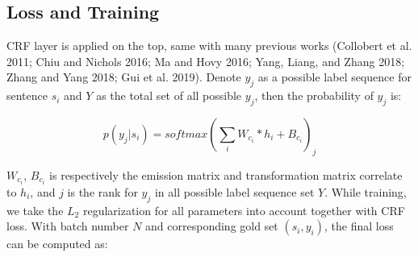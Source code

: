 \documentclass[letterpaper]{article} %
\begin{document}
\begin{table}[t]
\caption{Hyperparameters}\smallskip
\centering
{}
\label{table2}
\end{table}

\subsection{Loss and Training}

CRF layer is applied on the top, same with many previous works (Collobert et al. 2011; Chiu and Nichols 2016; Ma and Hovy 2016; Yang, Liang, and Zhang 2018; Zhang and Yang 2018; Gui et al. 2019). Denote $y_j$ as a possible label sequence for sentence $s_i$ and $Y$ as the total set of all possible $y_j$, then the probability of $y_j$ is:

\begin{equation}
p(y_j | s_i) = softmax(\sum_i{W_{c_i} * h_i} + B_{c_i})_j
\label{crf_probability}
\end{equation}

$W_{c_i}$, $B_{c_i}$ is respectively the emission matrix and transformation matrix correlate to $h_i$, and $j$ is the rank for $y_j$ in all possible label sequence set $Y$.  While training, we take the $L_2$ regularization for all parameters into account together with CRF loss. With batch number $N$ and corresponding gold set $(s_i, y_i)$, the final loss can be computed as:
\end{document}
